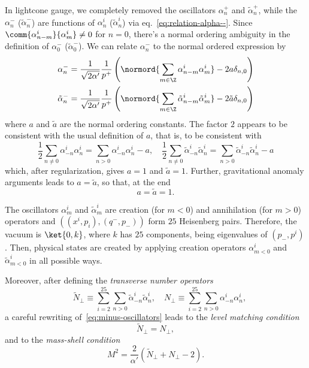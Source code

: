 In lightcone gauge, we completely removed the oscillators $\alpha^+_n$ and $\tilde{\alpha}^+_n$, while the $\alpha^-_n$ ($\tilde{\alpha}^-_n$) are functions of $\alpha^i_n$ ($\tilde{\alpha}^i_n$) via eq.~\eqref{eq:relation-alpha--}. Since $\comm{\alpha^i_{n-m}}{\alpha^i_m} \neq 0$ for $n = 0$, there's a normal ordering ambiguity in the definition of $\alpha^-_0$ ($\tilde{\alpha}^-_0$). We can relate $\alpha^-_n$ to the normal ordered expression by
\begin{equation}\label{eq:minus-oscillators}
\begin{aligned}
    \alpha^-_n &= \frac{1}{\sqrt{2\alpha'}} \frac{1}{p^+} \left( \normord{\sum_{m \in \Z} \alpha^i_{n-m} \alpha^i_m} - 2 a \delta_{n,0} \right) \\
    \tilde{\alpha}^-_n &= \frac{1}{\sqrt{2\alpha'}} \frac{1}{p^+} \left( \normord{\sum_{m \in \Z} \tilde{\alpha}^i_{n-m} \tilde{\alpha}^i_m} - 2 \tilde{a} \delta_{n,0} \right) 
\end{aligned}
\end{equation}
where $a$ and $\tilde{a}$ are the normal ordering constants. The factor $2$ appears to be consistent with the usual definition of $a$, that is, to be consistent with
\begin{equation}
    \frac{1}{2} \sum_{n\neq 0} \alpha^i_{-n} \alpha^i_n = \sum_{n>0} \alpha^i_{-n} \alpha^i_n - a, \quad \frac{1}{2} \sum_{n\neq 0} \tilde{\alpha}^i_{-n} \tilde{\alpha}^i_n = \sum_{n>0} \tilde{\alpha}^i_{-n} \tilde{\alpha}^i_n - a
\end{equation}
which, after regularization, gives $a = 1$ and $\tilde{a}=1$. Further, gravitational anomaly arguments leads to $a=\tilde{a}$, so that, at the end
\begin{equation}\label{eq:ordering-constants}
    a = \tilde{a} = 1.
\end{equation}

The oscillators $\alpha^i_m$ and $\tilde{\alpha}^i_m$ are creation (for $m < 0$) and annihilation (for $m>0$) operators and $( (x^i,p_i),(q^-,p_-) )$ form $25$ Heisenberg pairs. Therefore, the vacuum is $\ket{0,k}$, where $k$ has $25$ components, being eigenvalues of $(p_-,p^i)$. Then, physical states are created by applying creation operators $\alpha^i_{m<0}$ and $\tilde{\alpha}^i_{m<0}$ in all possible ways.

Moreover, after defining the \emph{transverse number operators}
\begin{equation}\label{eq:def-transverse-number-op}
    \quad \tilde{N}_\perp \equiv \sum_{i=2}^{25}\sum_{n>0} \tilde{\alpha}^i_{-n} \tilde{\alpha}^i_n, \quad {N}_\perp \equiv \sum_{i=2}^{25}\sum_{n>0} {\alpha}^i_{-n} {\alpha}^i_n ,
\end{equation}
a careful rewriting of~\eqref{eq:minus-oscillators} leads to the \emph{level matching condition}
\begin{equation}\label{eq:level-matching}
    \tilde{N}_\perp =  N_\perp,
\end{equation}
and to the \emph{mass-shell condition}
\begin{equation}\label{eq:mass-shell}
    M^2 = \frac{2}{\alpha'} (\tilde{N}_\perp + N_\perp - 2) .
\end{equation}


